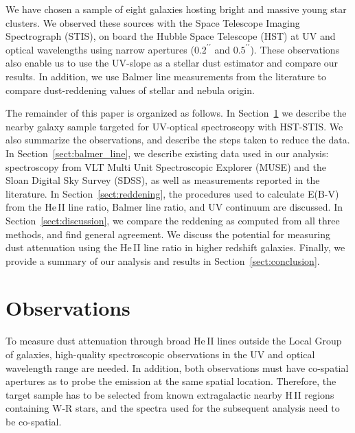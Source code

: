 \documentclass[linenumbers]{aastex63}
\begin{document}
We have chosen a sample of eight galaxies hosting bright and massive young star clusters. 
We observed these sources with the Space Telescope Imaging Spectrograph (STIS), on board the Hubble Space Telescope (HST) at UV and optical wavelengths using narrow apertures ($0.2^{\prime\prime}$ and $0.5^{\prime\prime}$). 
These observations also enable us to use the UV-slope as a stellar dust estimator and compare our results. In addition, we use Balmer line measurements from the literature to compare dust-reddening values of stellar and nebula origin.

The remainder of this paper is organized as follows. In Section~\ref{sect:heii_obs} we describe the nearby galaxy sample targeted for UV-optical spectroscopy with HST-STIS.  We also summarize the observations, and describe the steps taken to reduce the data.  In Section~\ref{sect:balmer_line}, we describe existing data used in our analysis: spectroscopy from VLT Multi Unit Spectroscopic Explorer (MUSE) and the Sloan Digital Sky Survey (SDSS), as well as measurements reported in the literature.  In Section~\ref{sect:reddening}, the procedures used to calculate E(B-V) from the He\,II line ratio, Balmer line ratio, and UV continuum are discussed.  In Section~\ref{sect:discussion}, we compare the reddening as computed from all three methods, and find general agreement. We discuss the potential for measuring dust attenuation using the He\,II line ratio in higher redshift galaxies.  Finally, we provide a summary of our analysis and results in Section~\ref{sect:conclusion}.


\section{Observations}\label{sect:heii_obs}
To measure dust attenuation through broad He\,II lines outside the Local Group of galaxies, high-quality spectroscopic observations in the UV and optical wavelength range are needed. 
In addition, both observations must have co-spatial apertures as to probe the emission at the same spatial location.
Therefore, the target sample has to be selected from known extragalactic nearby H\,II regions containing W-R stars, and the spectra used for the subsequent analysis need to be co-spatial.
\end{document}
